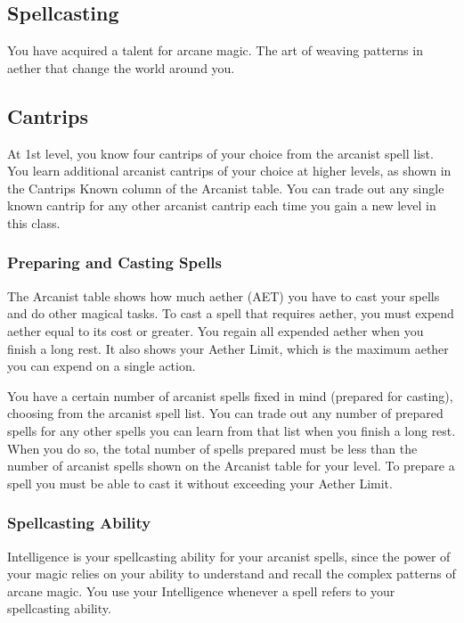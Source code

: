 \subsection{Spellcasting}

You have acquired a talent for arcane magic. The art of weaving patterns in aether that change the world around you.

\subsection{Cantrips}

At 1st level, you know four cantrips of your choice from the arcanist spell list. You learn additional arcanist cantrips of your choice at higher levels, as shown in the Cantrips Known column of the Arcanist table. You can trade out any single known cantrip for any other arcanist cantrip each time you gain a new level in this class.

\subsubsection{Preparing and Casting Spells}

The Arcanist table shows how much aether (AET) you have to cast your spells and do other magical tasks. To cast a spell that requires aether, you must expend aether equal to its cost or greater. You regain all expended aether when you finish a long rest. It also shows your Aether Limit, which is the maximum aether you can expend on a single action.

You have a certain number of arcanist spells fixed in mind (prepared for casting), choosing from the arcanist spell list. You can trade out any number of prepared spells for any other spells you can learn from that list when you finish a long rest. When you do so, the total number of spells prepared must be less than the number of arcanist spells shown on the Arcanist table for your level. To prepare a spell you must be able to cast it without exceeding your Aether Limit.

\subsubsection{Spellcasting Ability}

Intelligence is your spellcasting ability for your arcanist spells, since the power of your magic relies on your ability to understand and recall the complex patterns of arcane magic. You use your Intelligence whenever a spell refers to your spellcasting ability. 

